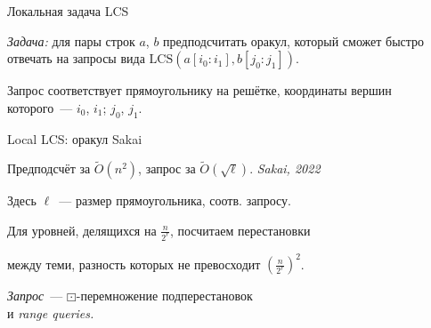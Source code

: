 \documentclass[svgnames]{beamer}
\newcommand{\flink}[1]{{\footnotesize\it\color{SkyBlue!40!White} #1}}
\begin{document}
\begin{frame}{Локальная задача LCS}

\begin{block}{\vspace*{-3ex}}
{\it Задача:}
для пары строк \(a\), \(b\) предподсчитать оракул, который сможет
быстро отвечать на запросы вида \(\text{LCS} (a[i_0 : i_1], b[j_0 : j_1])\).
\end{block} \vspace{4mm}

Запрос соответствует прямоугольнику на решётке, координаты вершин которого~—
\(i_0\), \(i_1\); \(j_0\), \(j_1\).

\end{frame}


\begin{frame}{Local LCS: оракул Sakai}
\vspace{-2mm}

Предподсчёт за \(\tilde O\left(n^2\right)\), запрос за \(\tilde O\left( \sqrt{\ell} \right)\). \hfill \flink{Sakai, 2022}

Здесь \(\ell\)~— размер прямоугольника, соотв. запросу.
\vspace{3mm}

Для уровней, делящихся на \(\frac{n}{2^r}\), посчитаем перестановки \vspace{-2mm}

между теми, разность которых не превосходит \(\left( \frac{n}{2^r} \right)^2\).

\begin{center}  \end{center}

{\it Запрос}~— \(\boxdot\)-перемножение подперестановок \\
и {\it range queries.}

\end{frame}
\end{document}
